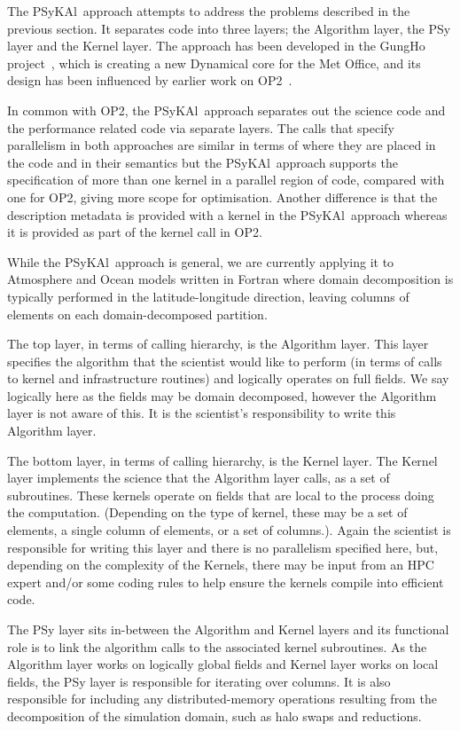 \documentclass{IOS-Book-Article}
\newcommand{\psykal}{{PS}y{KA}l}
\begin{document}
The \psykal\ approach attempts to address the problems described in the
previous section. It separates code into three layers; the Algorithm
layer, the PSy layer and the Kernel layer. The approach has been
developed in the GungHo project~\cite{GungHo}, which is creating a new
Dynamical core for the Met Office, and its design has been influenced
by earlier work on OP2~\cite{OP2,PYOP2}.

In common with OP2, the \psykal\ approach separates out the science
code and the performance related code via separate layers. The calls
that specify parallelism in both approaches are similar in terms of
where they are placed in the code and in their semantics but the
\psykal\ approach supports the specification of more than one kernel
in a parallel region of code, compared with one for OP2, giving more
scope for optimisation. Another difference is that the description
metadata is provided with a kernel in the \psykal\ approach whereas it
is provided as part of the kernel call in OP2.

While the \psykal\ approach is general, we are currently applying it to
Atmosphere and Ocean models written in Fortran where domain
decomposition is typically performed in the latitude-longitude
direction, leaving columns of elements on each domain-decomposed
partition.

The top layer, in terms of calling hierarchy, is the Algorithm
layer. This layer specifies the algorithm that the scientist would like
to perform (in terms of calls to kernel and infrastructure routines)
and logically operates on full fields. We say logically here as the
fields may be domain decomposed, however the Algorithm layer is not
aware of this. It is the scientist's responsibility to write this
Algorithm layer.

The bottom layer, in terms of calling hierarchy, is the Kernel
layer. The Kernel layer implements the science that the Algorithm
layer calls, as a set of subroutines. These kernels operate on fields
that are local to the process doing the computation. (Depending on the
type of kernel, these may be a set of elements, a single column of
elements, or a set of columns.). Again the scientist is responsible
for writing this layer and there is no parallelism specified here,
but, depending on the complexity of the Kernels, there may be input
from an HPC expert and/or some coding rules to help ensure the kernels
compile into efficient code.

The PSy layer sits in-between the Algorithm and Kernel layers and its
functional role is to link the algorithm calls to the associated
kernel subroutines. As the Algorithm layer works on logically global
fields and Kernel layer works on local fields, the PSy layer is
responsible for iterating over columns. It is also responsible for
including any distributed-memory operations resulting from the
decomposition of the simulation domain, such as halo swaps and
reductions.
\end{document}
